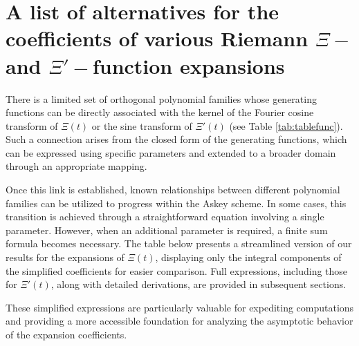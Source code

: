 \documentclass[a4paper,11pt,twoside]{amsart}
\begin{document}
\renewcommand{\theequation}{B.\arabic{equation}}
\setcounter{equation}{0}
\section{A list of alternatives for the coefficients of various Riemann $\Xi-$ and $\Xi'-$function expansions}\label{specexpansions}

There is a limited set of orthogonal polynomial families whose generating functions can be directly associated with the kernel of the Fourier cosine transform of $\Xi(t)$ or the sine transform of $\Xi{\prime}(t)$ (see Table \ref{tab:tablefunc}). Such a connection arises from the closed form of the generating functions, which can be expressed using specific parameters and extended to a broader domain through an appropriate mapping.

Once this link is established, known relationships between different polynomial families can be utilized to progress within the Askey scheme. In some cases, this transition is achieved through a straightforward equation involving a single parameter. However, when an additional parameter is required, a finite sum formula becomes necessary. The table below presents a streamlined version of our results for the expansions of $\Xi(t)$, displaying only the integral components of the simplified coefficients for easier comparison. Full expressions, including those for $\Xi{\prime}(t)$, along with detailed derivations, are provided in subsequent sections. 

These simplified expressions are particularly valuable for expediting computations and providing a more accessible foundation for analyzing the asymptotic behavior of the expansion coefficients.
\end{document}
